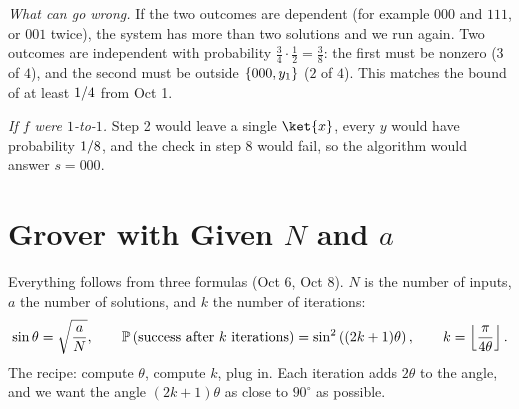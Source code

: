 \begin{exercisebox}
\begin{wsolution}
    \emph{What can go wrong.} If the two outcomes are dependent (for example $000$ and $111$, or
    $001$ twice), the system has more than two solutions and we run again. Two outcomes are
    independent with probability $\frac{3}{4} \cdot \frac{1}{2} = \frac{3}{8}$: the first must be
    nonzero ($3$ of $4$), and the second must be outside $\left\lbrace000, y_1\right\rbrace$ ($2$ of $4$). This matches
    the bound of at least $1/4$ from Oct 1.

    \emph{If $f$ were $1$-to-$1$.} Step 2 would leave a single $\ket{x}$, every $y$ would have
    probability $1/8$, and the check in step 8 would fail, so the algorithm would answer
    $s = 000$.
\end{wsolution}
\end{exercisebox}

\section{Grover with Given $N$ and $a$}\label{sec:grover}

Everything follows from three formulas (Oct 6, Oct 8). $N$ is the number of inputs, $a$ the number
of solutions, and $k$ the number of iterations:
\[\sin\theta = \sqrt{\frac{a}{N}},
    \qquad
    \prob{\text{success after } k \text{ iterations}} = \sin^2\left((2k+1)\theta\right),
    \qquad
    k = \floor{\frac{\pi}{4\theta}}.\]
The recipe: compute $\theta$, compute $k$, plug in. Each iteration adds $2\theta$ to the angle, and
we want the angle $(2k+1)\theta$ as close to $90^\circ$ as possible.

